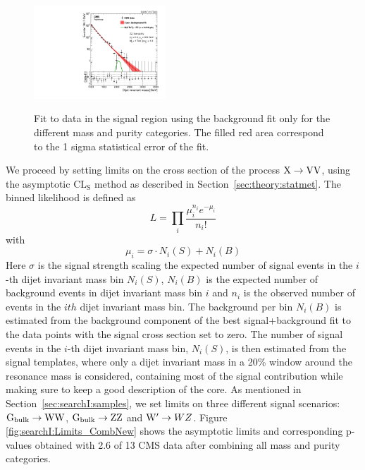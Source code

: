 \begin{figure}[h!]
\includegraphics[width=0.44\textwidth]{figures/analysis/search1/AN-15-211/fits/MLfits/BkgFit_DijetMassLowPuriZZ.pdf}\\
\caption{Fit to data in the signal region using the background fit only for the different mass and purity categories. The filled red area correspond to the 1 sigma statistical error of the fit.}
\label{fig:search1:bkgfitMassCat}
\end{figure}

We proceed by setting limits on the cross section of the process $\text{X} \to \mathrm{V}\mathrm{V}$, using the asymptotic $\textrm{CL}_\textrm{S}$ method as described in Section~\ref{sec:theory:statmet}. The binned likelihood is defined as
\begin{equation}
L = \prod_i\frac{\mu^{n_i}_ie^{-\mu_i}}{n_i!}
\end{equation}
with
\begin{equation}
\mu_i=\sigma \cdot N_i(S)+N_i(B)
\end{equation}
Here $\sigma$ is the signal strength scaling the expected number of signal events in the $i$-th dijet invariant mass bin $N_i(S)$, $N_i(B)$ is the expected number of background events in dijet invariant mass bin $i$ and $n_i$ is the observed number of events in the $ith$ dijet invariant mass bin. The background per bin $N_i(B)$ is estimated from the background component of the best signal+background fit to the data points with the signal cross section set to zero. The number of signal events in the $i$-th dijet invariant mass bin, $N_i(S)$, is then estimated from the signal templates, where only a dijet invariant mass in a 20\% window around the resonance mass is considered, containing most of the signal contribution while making sure to keep a good description of the core.
\newline
\newline
As mentioned in Section~\ref{sec:searchI:samples}, we set limits on three different signal scenarios: $\mathrm{G}_\mathrm{bulk} \rightarrow \mathrm{W}\mathrm{W}$, $\mathrm{G}_\mathrm{bulk} \rightarrow \mathrm{Z}\mathrm{Z}$ and $\mathrm{W}^\prime \rightarrow WZ$. Figure \ref{fig:searchI:Limits_CombNew} shows the asymptotic limits and corresponding p-values obtained with 2.6 \fbinv of 13 \TeV CMS data after combining all mass and purity categories.

